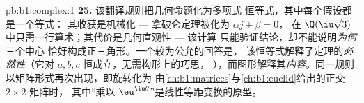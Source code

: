 \begin{solution}{pb:b1:complex:1}
\textbf{25.} 该翻译规则把几何命题化为多项式
恒等式，其中每个假设都是一个等式：
其收获是机械化 --- 拿破仑定理被化为
$\alpha j + \beta = 0$，
在 $\Q(\iu\sqrt3)$ 中只需一行算术；其代价是几何直观性 --- 该计算
只能验证结论，却不能说明\emph{为何}三个中心
恰好构成正三角形。一个较为公允的回答是，
该恒等式解释了定理的\emph{必然性}（它对
$a, b, c$ 恒成立，无需构形上的巧思，
），而图形解释其\emph{内容}。同一规则
以矩阵形式再次出现，即旋转化为
由\cref{ch:b1:matrices}与\cref{ch:b1:euclid}给出的正交 $2 \times 2$ 矩阵时，
其中“乘以
$\eu^{\iu\theta}$”是线性等距变换的原型。
\end{solution}
